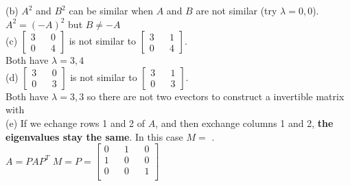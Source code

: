 \documentclass[10pt,twoside,reqno]{article}
\begin{document}
\begin{enumerate}
\vspace{3mm}
(b) $A^2$ and $B^2$ can be similar when $A$ and $B$ are not similar (try $\lambda = 0, 0$).\\
$A^2 = (-A)^2$ but $B \neq -A$\\

\vspace{3mm}
(c) $\left[\begin{smallmatrix} 3 && 0\\ 0 && 4 \end{smallmatrix} \right]$ is not similar to $\left[\begin{smallmatrix} 3 && 1\\ 0 && 4 \end{smallmatrix} \right]$.\\
Both have $\lambda = 3, 4$\\

\vspace{3mm}
(d) $\left[\begin{smallmatrix} 3 && 0\\ 0 && 3 \end{smallmatrix} \right]$ is not similar to $\left[\begin{smallmatrix} 3 && 1\\ 0 && 3 \end{smallmatrix} \right]$.\\
Both have $\lambda = 3, 3$ so there are not two evectors to construct a invertible matrix with\\

\vspace{3mm}
(e) If we echange rows 1 and 2 of $A$, and then exchange columns 1 and 2, \textbf{the eigenvalues stay the same}. In this case $M =$ \underline{\hspace{7mm}}.\\
$A = PAP^T$ \hspace{5mm} 
$
$$
M = P =
\begin{bmatrix}
0 && 1 && 0\\
1 && 0 && 0\\
0 && 0 && 1\\
\end{bmatrix}
$$
$\\

\vspace{3mm}
\end{enumerate}
\end{document}
